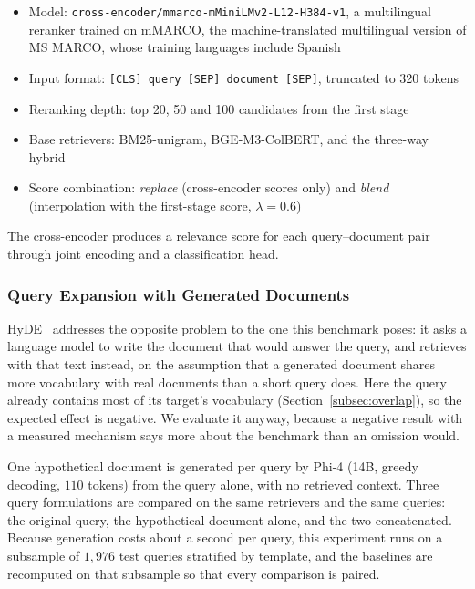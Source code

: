 \documentclass[preprint,review,12pt]{elsarticle}
\begin{document}
\begin{itemize}
    \item Model: \texttt{cross-encoder/mmarco-mMiniLMv2-L12-H384-v1}, a multilingual reranker trained on mMARCO, the machine-translated multilingual version of MS MARCO, whose training languages include Spanish
    \item Input format: \texttt{[CLS] query [SEP] document [SEP]}, truncated to 320 tokens
    \item Reranking depth: top 20, 50 and 100 candidates from the first stage
    \item Base retrievers: BM25-unigram, BGE-M3-ColBERT, and the three-way hybrid
    \item Score combination: \textit{replace} (cross-encoder scores only) and \textit{blend} (interpolation with the first-stage score, $\lambda = 0.6$)
\end{itemize}

The cross-encoder produces a relevance score for each query--document pair through joint encoding and a classification head.

\subsubsection{Query Expansion with Generated Documents}
\label{subsec:hyde_method}

HyDE~\citep{gao2023precise} addresses the opposite problem to the one this benchmark poses: it asks a language model to write the document that would answer the query, and retrieves with that text instead, on the assumption that a generated document shares more vocabulary with real documents than a short query does. Here the query already contains most of its target's vocabulary (Section~\ref{subsec:overlap}), so the expected effect is negative. We evaluate it anyway, because a negative result with a measured mechanism says more about the benchmark than an omission would.

One hypothetical document is generated per query by Phi-4 (14B, greedy decoding, $110$ tokens) from the query alone, with no retrieved context. Three query formulations are compared on the same retrievers and the same queries: the original query, the hypothetical document alone, and the two concatenated. Because generation costs about a second per query, this experiment runs on a subsample of $1{,}976$ test queries stratified by template, and the baselines are recomputed on that subsample so that every comparison is paired.
\end{document}

